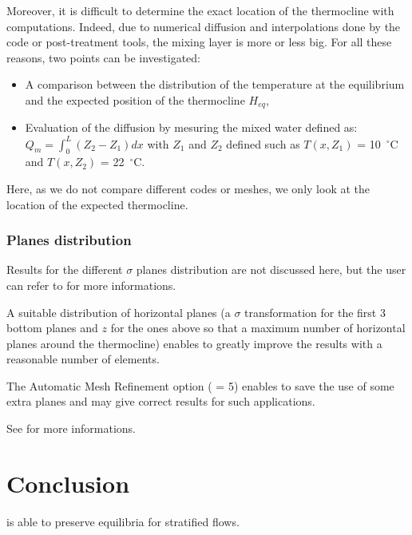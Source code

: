 Moreover, it is difficult to determine the exact location of the thermocline
with computations.
Indeed, due to numerical diffusion and interpolations done by the code or
post-treatment tools, the mixing layer is more or less big.
For all these reasons, two points can be investigated:
\begin{itemize}
\item A comparison between the distribution of the temperature at the equilibrium
  and the expected position of the thermocline $H_{eq}$,
\item Evaluation of the diffusion by mesuring the mixed water defined as:
  $Q_m = \int_{0}^{L} (Z_2 - Z_1) dx$
  with $Z_1$ and $Z_2$ defined such as $T(x,Z_1)$ = 10~$^{\circ}$C
  and $T(x,Z_2)$ = 22~$^{\circ}$C.
\end{itemize}

Here, as we do not compare different codes or meshes, we only look at the
location of the expected thermocline.

\subsubsection{Planes distribution}
Results for the different $\sigma$ planes distribution are not discussed here,
but the user can refer to \cite{Abbas2015} for more informations.

A suitable distribution of horizontal planes (a $\sigma$ transformation for the
first 3 bottom planes and $z$ for the ones above so that a maximum number of
horizontal planes around the thermocline) enables to greatly improve the results
with a reasonable number of elements.

The Automatic Mesh Refinement option ( = 5) enables
to save the use of some extra planes and may give correct results for such
applications.

See \cite{Abbas2015} for more informations.
%
\section{Conclusion}
%
 is able to preserve equilibria for stratified flows.

